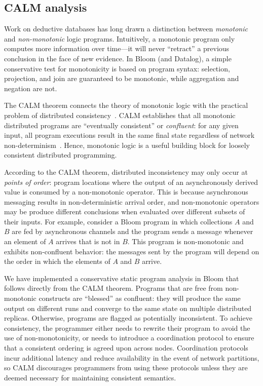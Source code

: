\subsection{CALM analysis}
\label{sec:bg-calm}

Work on deductive databases has long drawn a distinction between
\emph{monotonic} and \emph{non-monotonic} logic programs. Intuitively, a
monotonic program only computes more information over time---it will never
``retract'' a previous conclusion in the face of new evidence.  In Bloom (and
Datalog), a simple conservative test for monotonicity is based on program
syntax: selection, projection, and join are guaranteed to be monotonic, while aggregation and negation are not.

The CALM theorem connects the theory of monotonic logic with the practical
problem of distributed consistency~\cite{Alvaro2011,Hellerstein2010}.  CALM establishes that all
monotonic distributed programs are ``eventually consistent'' or
\emph{confluent}: for any given input, all program executions result in the same
final state regardless of network
non-determinism~\cite{Ameloot2011,dedalus-pods12-tr}.  Hence, monotonic logic is
a useful building block for loosely consistent distributed programming.

According to the CALM theorem, distributed inconsistency may only occur at
\emph{points of order}: program locations where the output of an asynchronously
derived value is consumed by a non-monotonic operator.  This is because
asynchronous messaging results in non-deterministic arrival order, and
non-monotonic operators may be produce different conclusions when evaluated over
different subsets of their inputs.  For example, consider a Bloom program in
which collections $A$ and $B$ are fed by asynchronous channels and the program
sends a message whenever an element of $A$ arrives that is not in $B$. This
program is non-monotonic and exhibits non-confluent behavior: the messages sent
by the program will depend on the order in which the elements of $A$ and $B$
arrive.

We have implemented a conservative static program analysis in Bloom that follows
directly from the CALM theorem.  Programs that are free from non-monotonic
constructs are ``blessed'' as confluent: they will produce the same output on different
runs and converge to the same state on multiple distributed replicas.
Otherwise, programs are flagged as potentially inconsistent.  To achieve
consistency, the programmer either needs to rewrite their program to avoid the
use of non-monotonicity, or needs to introduce a coordination protocol to ensure that a
consistent ordering is agreed upon across nodes. Coordination protocols incur additional
latency and reduce availability in the event of network partitions, so CALM discourages programmers from using these protocols unless they are deemed necessary for maintaining consistent semantics.

